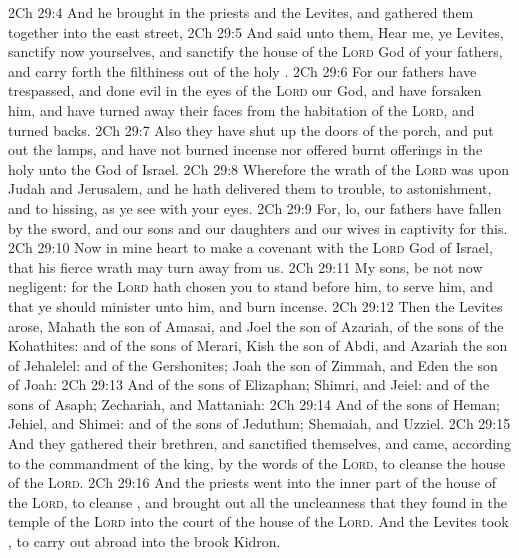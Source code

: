 \vs 2Ch 29:4 And he brought in the priests and the Levites, and gathered them together into the east street,
\vs 2Ch 29:5 And said unto them, Hear me, ye Levites, sanctify now yourselves, and sanctify the house of the \textsc{Lord} God of your fathers, and carry forth the filthiness out of the holy .
\vs 2Ch 29:6 For our fathers have trespassed, and done  evil in the eyes of the \textsc{Lord} our God, and have forsaken him, and have turned away their faces from the habitation of the \textsc{Lord}, and turned  backs.
\vs 2Ch 29:7 Also they have shut up the doors of the porch, and put out the lamps, and have not burned incense nor offered burnt offerings in the holy  unto the God of Israel.
\vs 2Ch 29:8 Wherefore the wrath of the \textsc{Lord} was upon Judah and Jerusalem, and he hath delivered them to trouble, to astonishment, and to hissing, as ye see with your eyes.
\vs 2Ch 29:9 For, lo, our fathers have fallen by the sword, and our sons and our daughters and our wives  in captivity for this.
\vs 2Ch 29:10 Now  in mine heart to make a covenant with the \textsc{Lord} God of Israel, that his fierce wrath may turn away from us.
\vs 2Ch 29:11 My sons, be not now negligent: for the \textsc{Lord} hath chosen you to stand before him, to serve him, and that ye should minister unto him, and burn incense.
\vs 2Ch 29:12 Then the Levites arose, Mahath the son of Amasai, and Joel the son of Azariah, of the sons of the Kohathites: and of the sons of Merari, Kish the son of Abdi, and Azariah the son of Jehalelel: and of the Gershonites; Joah the son of Zimmah, and Eden the son of Joah:
\vs 2Ch 29:13 And of the sons of Elizaphan; Shimri, and Jeiel: and of the sons of Asaph; Zechariah, and Mattaniah:
\vs 2Ch 29:14 And of the sons of Heman; Jehiel, and Shimei: and of the sons of Jeduthun; Shemaiah, and Uzziel.
\vs 2Ch 29:15 And they gathered their brethren, and sanctified themselves, and came, according to the commandment of the king, by the words of the \textsc{Lord}, to cleanse the house of the \textsc{Lord}.
\vs 2Ch 29:16 And the priests went into the inner part of the house of the \textsc{Lord}, to cleanse , and brought out all the uncleanness that they found in the temple of the \textsc{Lord} into the court of the house of the \textsc{Lord}. And the Levites took , to carry  out abroad into the brook Kidron.
